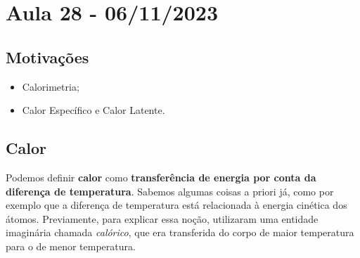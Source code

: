 \documentclass[phsyicsII_notes.tex]{subfiles}
\begin{document}
\section{Aula 28 - 06/11/2023}
\subsection{Motivações}
\begin{itemize}
	\item Calorimetria;
	\item Calor Específico e Calor Latente.
\end{itemize}
\subsection{Calor}
Podemos definir \textbf{calor} como \textbf{transferência de energia por conta da diferença de temperatura}. Sabemos algumas coisas
a priori já, como por exemplo que a diferença de temperatura está relacionada à energia cinética dos átomos. Previamente,
para explicar essa noção, utilizaram uma entidade imaginária chamada \textit{calórico}, que era transferida do corpo de maior temperatura
para o de menor temperatura.
\end{document}
